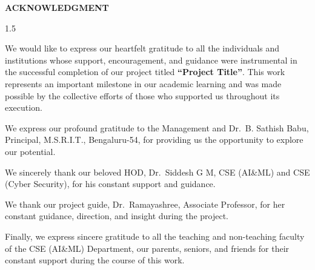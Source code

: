 \begin{center}

\textbf{{\huge ACKNOWLEDGMENT}}
\end{center}
\vspace{2cm}
\begin{spacing}{1.5}

We would like to express our heartfelt gratitude to all the individuals and institutions whose support, encouragement, and guidance were instrumental in the successful completion of our project titled \textbf{``Project Title''}. This work represents an important milestone in our academic learning and was made possible by the collective efforts of those who supported us throughout its execution.

We express our profound gratitude to the Management and Dr.~B. Sathish Babu, Principal, M.S.R.I.T., Bengaluru-54, for providing us the opportunity to explore our potential.

We sincerely thank our beloved HOD, Dr.~Siddesh G M, CSE (AI\&ML) and CSE (Cyber Security), for his constant support and guidance.

We thank our project guide, Dr.~Ramayashree, Associate Professor, for her constant guidance, direction, and insight during the project.

Finally, we express sincere gratitude to all the teaching and non-teaching faculty of the CSE (AI\&ML) Department, our parents, seniors, and friends for their constant support during the course of this work.
\end{spacing}
